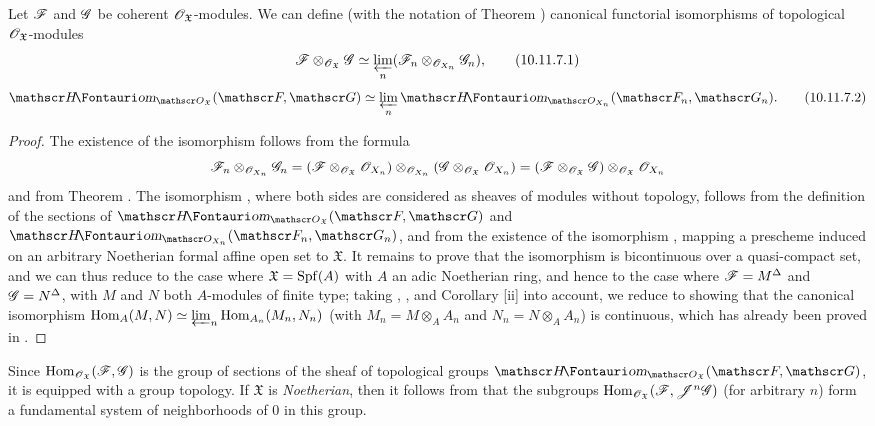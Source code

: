 \begin{proposition}[10.11.7]
\label{1.10.11.7}
Let $\mathscr{F}$ and $\mathscr{G}$ be coherent $\mathscr{O}_\mathfrak{X}$-modules.
We can define (with the notation of Theorem ) canonical functorial isomorphisms of topological $\mathscr{O}_\mathfrak{X}$-modules 
\begin{equation*}
\label{1.10.11.7.1}
  \mathscr{F}\otimes_{\mathscr{O}_\mathfrak{X}}\mathscr{G}\simeq\varprojlim_n(\mathscr{F}_n\otimes_{\mathscr{O}_{X_n}}\mathscr{G}_n),
  \tag{10.11.7.1}
\end{equation*}
\begin{equation*}
\label{1.10.11.7.2}
  \shHom_{\sh{O}_\mathfrak{X}}(\sh{F},\sh{G})\isoto\varprojlim_n\shHom_{\sh{O}_{X_n}}(\sh{F}_n,\sh{G}_n).
  \tag{10.11.7.2}
\end{equation*}
\end{proposition}

\begin{proof}
\label{proof-1.10.11.7}
The existence of the isomorphism  follows from the formula
\[
  \mathscr{F}_n\otimes_{\mathscr{O}_{X_n}}\mathscr{G}_n=(\mathscr{F}\otimes_{\mathscr{O}_\mathfrak{X}}\mathscr{O}_{X_n})\otimes_{\mathscr{O}_{X_n}}(\mathscr{G}\otimes_{\mathscr{O}_\mathfrak{X}}\mathscr{O}_{X_n})=(\mathscr{F}\otimes_{\mathscr{O}_\mathfrak{X}}\mathscr{G})\otimes_{\mathscr{O}_\mathfrak{X}}\mathscr{O}_{X_n}
\]
and from Theorem .
The isomorphism , where both sides are considered as sheaves of modules without topology, follows from the definition of the sections of $\shHom_{\sh{O}_\mathfrak{X}}(\sh{F},\sh{G})$ and $\shHom_{\sh{O}_{X_n}}(\sh{F}_n,\sh{G}_n)$, and from the existence of the isomorphism , mapping a prescheme induced on an arbitrary Noetherian formal affine open set to $\mathfrak{X}$.
It remains to prove that the isomorphism  is bicontinuous over a quasi-compact set, and we can thus reduce to the case where $\mathfrak{X}=\operatorname{Spf}(A)$ with $A$ an adic Noetherian ring, and hence  to the case where $\mathscr{F}=M^\Delta$ and $\mathscr{G}=N^\Delta$, with $M$ and $N$ both $A$-modules of finite type; taking , , and Corollary [ii] into account, we reduce to showing that the canonical isomorphism $\operatorname{Hom}_A(M,N)\simeq\varprojlim_n\operatorname{Hom}_{A_n}(M_n,N_n)$ (with $M_n=M\otimes_A A_n$ and $N_n=N\otimes_A A_n$) is continuous, which has already been proved in .
\end{proof}

\begin{env}[10.11.8]
\label{1.10.11.8}
Since $\operatorname{Hom}_{\mathscr{O}_\mathfrak{X}}(\mathscr{F},\mathscr{G})$ is the group of sections of the sheaf of topological groups $\shHom_{\sh{O}_\mathfrak{X}}(\sh{F},\sh{G})$, it is equipped with a group topology.
If $\mathfrak{X}$ is \emph{Noetherian}, then it follows from  that the subgroups $\operatorname{Hom}_{\mathscr{O}_\mathfrak{X}}(\mathscr{F},\mathscr{J}^n\mathscr{G})$ (for arbitrary $n$) form a fundamental system of neighborhoods of $0$ in this group.
\end{env}

